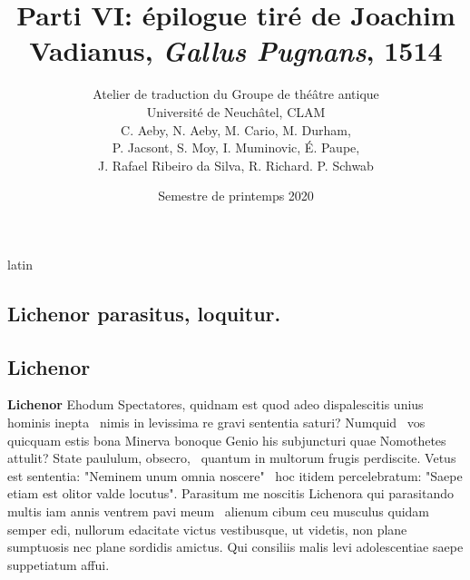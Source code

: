 \documentclass[12pt]{book}
\renewenvironment{latin}
    	{\begin{hyphenrules}{latin}}
    	{\end{hyphenrules}}
\begin{document}
        \title{Parti VI: épilogue tiré de Joachim Vadianus, \textit{Gallus Pugnans}, 1514}
        \author{Atelier de traduction du Groupe de théâtre antique\\
            Université de Neuchâtel, CLAM\\
            C. Aeby, N. Aeby, M. Cario, M. Durham,\\ 
            P. Jacsont, S. Moy, I. Muminovic, É. Paupe,\\
            J. Rafael Ribeiro da Silva, R. Richard. P. Schwab}
        \date{Semestre de printemps 2020}
        
        \maketitle
        \begin{pages}
        \begin{latin}
        \begin{Leftside}
        \beginnumbering 
            \pstart\section*{Lichenor parasitus, loquitur.}\pend\pstart\subsection*{Lichenor}\pend\pstart\textbf{Lichenor}\hspace{1cm} 
                        Ehodum Spectatores, quidnam est quod adeo dispalescitis unius hominis inepta ﻿\ampersand\ nimis in levissima re gravi sententia saturi? 
                        Numquid ﻿\ampersand\ vos quicquam estis bona Minerva bonoque Genio his subjuncturi quae Nomothetes attulit? 
                        State paululum, obsecro, ﻿\ampersand\ quantum in multorum  frugis  perdiscite. 
                        Vetus est sententia: "Neminem unum omnia noscere" ﻿\ampersand\ hoc itidem percelebratum: 
                        "Saepe etiam est olitor valde  locutus". 
                        Parasitum me noscitis Lichenora 
                        qui parasitando multis iam annis ventrem pavi meum ﻿\ampersand\ alienum cibum ceu musculus quidam semper edi, 
                        nullorum edacitate  victus 
                        vestibusque, ut videtis, non plane sumptuosis nec plane sordidis amictus. 
                        Qui consiliis  malis levi adolescentiae saepe suppetiatum affui. 

\end{Leftside}
\end{latin}
\end{pages}
\end{document}
